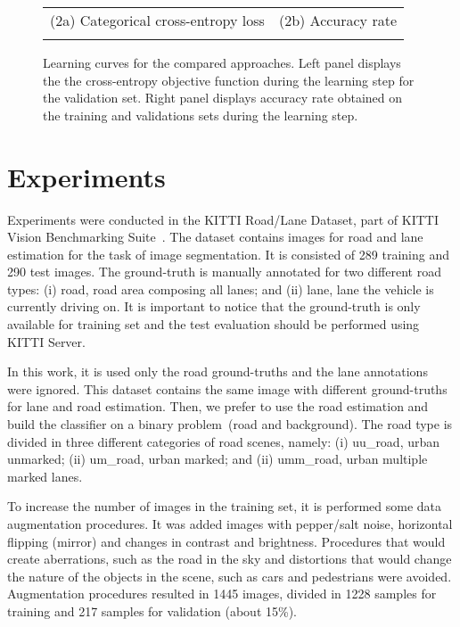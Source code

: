 \begin{figure*}[!h]
\begin{center}
\begin{tabular}{ll}
(2a) Categorical cross-entropy loss&(2b) Accuracy rate \\
&
\\
\end{tabular}%
\caption{Learning curves for the compared approaches. Left panel displays the the cross-entropy objective function during the learning step for the validation set. Right panel displays accuracy rate obtained on the training and validations sets during the learning step.}
\end{center}
\label{fig:learning}
\end{figure*}

\section{Experiments}
\label{sec:experiments}

Experiments were conducted in the KITTI Road/Lane Dataset, part of KITTI Vision Benchmarking Suite~\cite{KITTI}. The dataset  contains  images for road and lane estimation for the task of image segmentation. It is consisted of 289 training and 290 test images. The ground-truth is manually annotated for two different road types: (i) road, road area composing all lanes; and (ii) lane, lane the vehicle is currently driving on. It is important to notice that the ground-truth is only available for training set and the test evaluation should be performed using KITTI Server.

In this work, it is used only the road ground-truths and the lane annotations were ignored. This dataset contains the same image with different ground-truths for lane and road estimation. Then, we prefer to use the road estimation and build the classifier on a binary problem~(road and background). The road type is divided in three different categories of road scenes, namely: (i) uu\_road, urban unmarked; (ii) um\_road, urban marked; and (ii) umm\_road, urban multiple marked lanes.  

To increase the number of images in the training set, it is performed some data augmentation procedures. It was added images with pepper/salt noise, horizontal flipping (mirror) and  changes in contrast and brightness. Procedures that would create aberrations, such as the road in the sky and distortions that would change the nature of the objects in the scene, such as cars and pedestrians were avoided. Augmentation procedures resulted in 1445 images, divided in 1228 samples for training and 217 samples for validation (about 15\%). 


